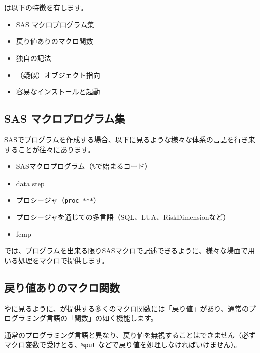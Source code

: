 \section{\DocStrTitleRDMFeatures}
\RDM は以下の特徴を有します。
\begin{itemize}
	\item SAS マクロプログラム集
	\item 戻り値ありのマクロ関数
	\item 独自の記法
	\item （疑似）オブジェクト指向
	\item 容易なインストールと起動
\end{itemize}
 
\subsection{SAS マクロプログラム集}
SASでプログラムを作成する場合、以下に見るような様々な体系の言語を行き来することが往々にあります。
\begin{itemize}
\item SASマクロプログラム（\texttt{\%}で始まるコード）
\item data step
\item プロシージャ（\texttt{proc ***}）
\item プロシージャを通じての多言語（SQL、LUA、RiskDimensionなど）
\item fcmp
\end{itemize}
\RDM では、プログラムを出来る限りSASマクロで記述できるように、様々な場面で用いる処理をマクロで提供します。
 
\subsection{戻り値ありのマクロ関数}
やに見るように、\RDM が提供する多くのマクロ関数には「戻り値」があり、通常のプログラミング言語の「関数」の如く機能します。
 
\begin{marker}
通常のプログラミング言語と異なり、戻り値を無視することはできません（必ずマクロ変数で受けとる、\texttt{\%put} などで戻り値を処理しなければいけません）。
\end{marker}
 
